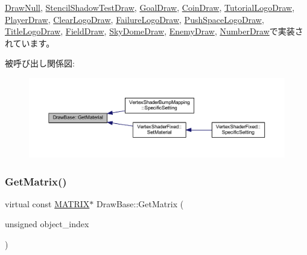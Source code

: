 \mbox{\hyperlink{class_draw_null_a84969d22d3436986f214e9896fe44fc6}{Draw\+Null}}, \mbox{\hyperlink{class_stencil_shadow_test_draw_abfc9caaaa1b6120e2013701a9d264f2d}{Stencil\+Shadow\+Test\+Draw}}, \mbox{\hyperlink{class_goal_draw_a47baf72f8c1c961176610f161069b8d1}{Goal\+Draw}}, \mbox{\hyperlink{class_coin_draw_a869a6b7273b273048dd56822fae4d644}{Coin\+Draw}}, \mbox{\hyperlink{class_tutorial_logo_draw_a3a97860361e32a727246e99052715f37}{Tutorial\+Logo\+Draw}}, \mbox{\hyperlink{class_player_draw_ae818d3adaf5120845c2a78c230b5365e}{Player\+Draw}}, \mbox{\hyperlink{class_clear_logo_draw_ab356bf5d56c10a6689e101b35c30d889}{Clear\+Logo\+Draw}}, \mbox{\hyperlink{class_failure_logo_draw_aaac019fb396a354ef0f823ed2bd72322}{Failure\+Logo\+Draw}}, \mbox{\hyperlink{class_push_space_logo_draw_a0734eed4096afb12e6c9ef1f4d82b9d8}{Push\+Space\+Logo\+Draw}}, \mbox{\hyperlink{class_title_logo_draw_a8858aa1b1eb9a6d4cb4605519efb20eb}{Title\+Logo\+Draw}}, \mbox{\hyperlink{class_field_draw_ab126f938895211ff170bc37045a8e7a2}{Field\+Draw}}, \mbox{\hyperlink{class_sky_dome_draw_acbc487d912b464474ae6f1afd7d6bb74}{Sky\+Dome\+Draw}}, \mbox{\hyperlink{class_enemy_draw_a12f00116f7fa97e07317a949d5c27bb4}{Enemy\+Draw}}, \mbox{\hyperlink{class_number_draw_a3348d9d1cdd9dd03be25b82069275ca5}{Number\+Draw}}で実装されています。

被呼び出し関係図\+:\nopagebreak
\begin{figure}[H]
\begin{center}
\leavevmode
\includegraphics[width=350pt]{class_draw_base_ad82a75dff8e4e2f2ebbec2dd0d0734e5_icgraph}
\end{center}
\end{figure}
\mbox{\label{class_draw_base_a01239bf362040f7f2ef5e5f5371dcf18}} 
\subsubsection{\texorpdfstring{Get\+Matrix()}{GetMatrix()}}
{\footnotesize\ttfamily virtual const \mbox{\hyperlink{_vector3_d_8h_a032295cd9fb1b711757c90667278e744}{M\+A\+T\+R\+IX}}$\ast$ Draw\+Base\+::\+Get\+Matrix (\begin{DoxyParamCaption}\item[{unsigned}]{object\+\_\+index }\end{DoxyParamCaption})\hspace{0.3cm}{\ttfamily [pure virtual]}}



